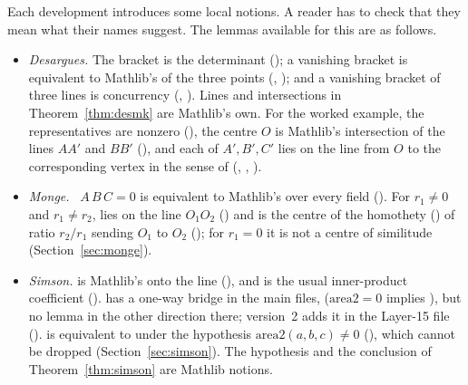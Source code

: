 \documentclass[11pt]{article}
\theoremstyle{definition}
\theoremstyle{remark}
\begin{document}
Each development introduces some local notions. A reader has to check that they mean what their
names suggest. The lemmas available for this are as follows.
\begin{itemize}
\item \emph{Desargues.} The bracket is the determinant (); a vanishing
bracket is equivalent to Mathlib's  of the three points
(, );
and a vanishing bracket of three lines is concurrency
(,
). Lines and intersections in
Theorem~\ref{thm:desmk} are Mathlib's own. For the worked example, the representatives are nonzero
(), the centre $O$ is Mathlib's intersection
 of the lines $AA'$ and $BB'$ (), and
each of $A',B',C'$ lies on the line from $O$ to the corresponding vertex in the sense of
 (,
, ).
\item \emph{Monge.} ~$A\,B\,C=0$ is equivalent to Mathlib's  over
every field (). For $r_1\ne0$ and $r_1\ne r_2$,
 lies on the line $O_1O_2$ () and is the centre of the
homothety () of ratio $r_2/r_1$ sending $O_1$ to $O_2$
(); for $r_1=0$ it is not a centre of similitude
(Section~\ref{sec:monge}).
\item \emph{Simson.}  is Mathlib's
 onto the line
(), and  is the usual
inner-product coefficient ().  has a one-way
bridge in the main files,  ($\mathrm{area2}=0$ implies ), but
no lemma in the other direction there; version~2 adds it in the Layer-15 file
().  is equivalent to  under
the hypothesis $\mathrm{area2}(a,b,c)\ne0$ (), which
cannot be dropped (Section~\ref{sec:simson}). The hypothesis and the conclusion of
Theorem~\ref{thm:simson} are Mathlib notions.

\end{itemize}
\end{document}
